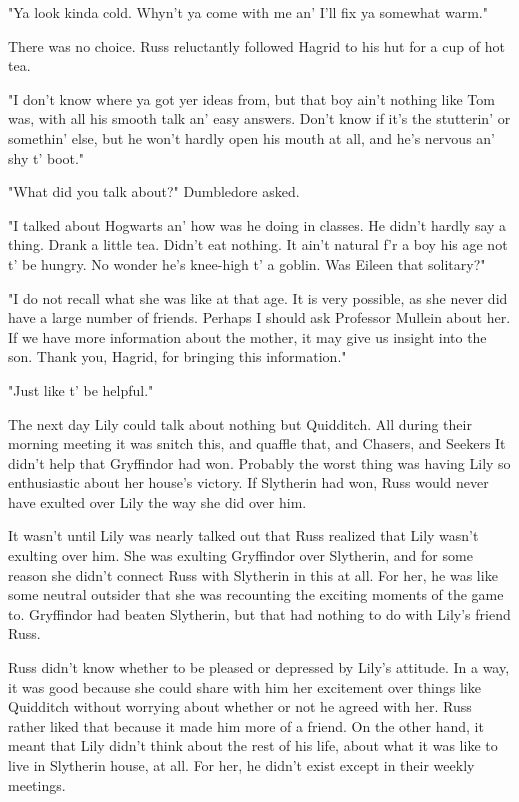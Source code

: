 "Ya look kinda cold. Whyn't ya come with me an' I'll fix ya somewhat warm."

There was no choice. Russ reluctantly followed Hagrid to his hut for a cup of hot tea.

"I don't know where ya got yer ideas from, but that boy ain't nothing like Tom was, with all his smooth talk an' easy answers. Don't know if it's the stutterin' or somethin' else, but he won't hardly open his mouth at all, and he's nervous an' shy t' boot."

"What did you talk about?" Dumbledore asked.

"I talked about Hogwarts an' how was he doing in classes. He didn't hardly say a thing. Drank a little tea. Didn't eat nothing. It ain't natural f'r a boy his age not t' be hungry. No wonder he's knee-high t' a goblin. Was Eileen that solitary?"

"I do not recall what she was like at that age. It is very possible, as she never did have a large number of friends. Perhaps I should ask Professor Mullein about her. If we have more information about the mother, it may give us insight into the son. Thank you, Hagrid, for bringing this information."

"Just like t' be helpful."

The next day Lily could talk about nothing but Quidditch. All during their morning meeting it was snitch this, and quaffle that, and Chasers, and Seekers{\el} It didn't help that Gryffindor had won. Probably the worst thing was having Lily so enthusiastic about her house's victory. If Slytherin had won, Russ would never have exulted over Lily the way she did over him.

It wasn't until Lily was nearly talked out that Russ realized that Lily wasn't exulting over him. She was exulting Gryffindor over Slytherin, and for some reason she didn't connect Russ with Slytherin in this at all. For her, he was like some neutral outsider that she was recounting the exciting moments of the game to. Gryffindor had beaten Slytherin, but that had nothing to do with Lily's friend Russ.

Russ didn't know whether to be pleased or depressed by Lily's attitude. In a way, it was good because she could share with him her excitement over things like Quidditch without worrying about whether or not he agreed with her. Russ rather liked that because it made him more of a friend. On the other hand, it meant that Lily didn't think about the rest of his life, about what it was like to live in Slytherin house, at all. For her, he didn't exist except in their weekly meetings.

